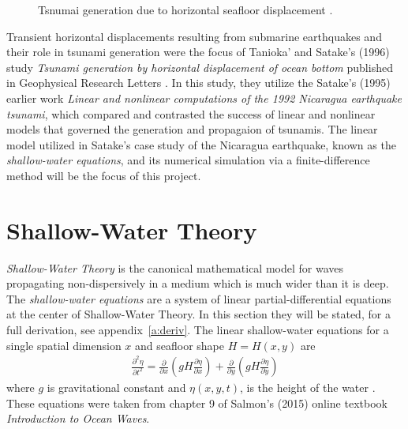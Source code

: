 \documentclass[12pt,a4]{article}
\begin{document}
\begin{figure}[h]
    \centering
    \caption{Tsnumai generation due to horizontal seafloor displacement \cite{marghany}.}
    \label{fig:tsu_gen}
\end{figure}

Transient horizontal displacements resulting from submarine earthquakes and their role in tsunami generation were the focus of  Tanioka' and Satake's (1996) study \textit{Tsunami generation by horizontal displacement of ocean bottom} published in Geophysical Research Letters \cite{satake1}. In this study, they utilize the Satake's (1995) earlier work \textit{Linear and nonlinear computations of the 1992 Nicaragua earthquake tsunami}, which compared and contrasted the success of linear and nonlinear models that governed the generation and propagaion of tsunamis. The linear model utilized in Satake's case study of the Nicaragua earthquake, known as the \textit{shallow-water equations}, and its numerical simulation via a finite-difference method will be the focus of this project.

\section{Shallow-Water Theory}
\textit{Shallow-Water Theory} is the canonical mathematical model for waves propagating non-dispersively in a medium which is much wider than it is deep. The \textit{shallow-water equations} are a system of linear partial-differential equations at the center of Shallow-Water Theory. In this section they will be stated, for a full derivation, see appendix~\ref{a:deriv}. The linear shallow-water equations for a single spatial dimension $x$ and  seafloor shape $H=H(x,y)$ are
\begin{gather}\label{eq:shallow}
    \frac{\partial^2 \eta}{\partial t^2} = \frac{\partial}{\partial x}\left( gH\frac{\partial \eta}{\partial x} \right) + \frac{\partial}{\partial y}\left( gH\frac{\partial \eta}{\partial y} \right)
\end{gather}
where $g$ is gravitational constant and $\eta(x,y,t)$, is the height of the water \cite{salmon}. These equations were taken from chapter 9 of Salmon's (2015) online textbook \textit{Introduction to Ocean Waves}.
\end{document}
